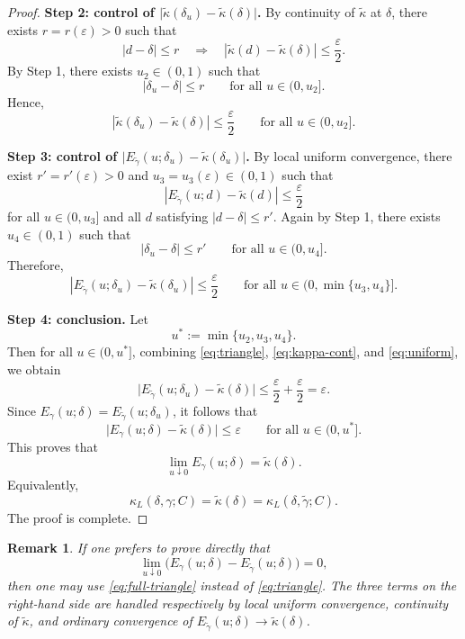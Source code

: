 \documentclass[11pt]{article}
\newtheorem{remark}[theorem]{Remark}
\begin{document}
\begin{proof}
\medskip
\noindent
\textbf{Step 2: control of \(\bigl|\tilde{\kappa}(\delta_u)-\tilde{\kappa}(\delta)\bigr|\).}
By continuity of \(\tilde{\kappa}\) at \(\delta\), there exists \(r=r(\varepsilon)>0\) such that
\[
|d-\delta|\le r
\quad\Longrightarrow\quad
|\tilde{\kappa}(d)-\tilde{\kappa}(\delta)|\le \frac{\varepsilon}{2}.
\]
By Step 1, there exists \(u_2\in(0,1)\) such that
\[
|\delta_u-\delta|\le r
\qquad\text{for all }u\in(0,u_2].
\]
Hence,
\begin{equation}\label{eq:kappa-cont}
|\tilde{\kappa}(\delta_u)-\tilde{\kappa}(\delta)|\le \frac{\varepsilon}{2}
\qquad\text{for all }u\in(0,u_2].
\end{equation}

\medskip
\noindent
\textbf{Step 3: control of \(\bigl|E_{\tilde\gamma}(u;\delta_u)-\tilde{\kappa}(\delta_u)\bigr|\).}
By local uniform convergence, there exist \(r'=r'(\varepsilon)>0\) and \(u_3=u_3(\varepsilon)\in(0,1)\) such that
\[
\left|
E_{\tilde\gamma}(u;d)-\tilde{\kappa}(d)
\right|
\le \frac{\varepsilon}{2}
\]
for all \(u\in(0,u_3]\) and all \(d\) satisfying \(|d-\delta|\le r'\). Again by Step 1, there exists \(u_4\in(0,1)\) such that
\[
|\delta_u-\delta|\le r'
\qquad\text{for all }u\in(0,u_4].
\]
Therefore,
\begin{equation}\label{eq:uniform}
\left|
E_{\tilde\gamma}(u;\delta_u)-\tilde{\kappa}(\delta_u)
\right|
\le \frac{\varepsilon}{2}
\qquad\text{for all }u\in(0,\min\{u_3,u_4\}].
\end{equation}

\medskip
\noindent
\textbf{Step 4: conclusion.}
Let
\[
u^*:=\min\{u_2,u_3,u_4\}.
\]
Then for all \(u\in(0,u^*]\), combining \eqref{eq:triangle}, \eqref{eq:kappa-cont}, and \eqref{eq:uniform}, we obtain
\[
\bigl|E_{\tilde\gamma}(u;\delta_u)-\tilde{\kappa}(\delta)\bigr|
\le
\frac{\varepsilon}{2}+\frac{\varepsilon}{2}
=
\varepsilon.
\]
Since \(E_\gamma(u;\delta)=E_{\tilde\gamma}(u;\delta_u)\), it follows that
\[
\bigl|E_\gamma(u;\delta)-\tilde{\kappa}(\delta)\bigr|
\le \varepsilon
\qquad\text{for all }u\in(0,u^*].
\]
This proves that
\[
\lim_{u\downarrow 0}E_\gamma(u;\delta)=\tilde{\kappa}(\delta).
\]
Equivalently,
\[
\kappa_L(\delta,\gamma;C)=\tilde{\kappa}(\delta)=\kappa_L(\delta,\tilde\gamma;C).
\]
The proof is complete.
\end{proof}

\begin{remark}
If one prefers to prove directly that
\[
\lim_{u\downarrow 0}\bigl(E_\gamma(u;\delta)-E_{\tilde\gamma}(u;\delta)\bigr)=0,
\]
then one may use \eqref{eq:full-triangle} instead of \eqref{eq:triangle}. The three terms on the right-hand side are handled respectively by local uniform convergence, continuity of \(\tilde{\kappa}\), and ordinary convergence of \(E_{\tilde\gamma}(u;\delta)\to \tilde{\kappa}(\delta)\).
\end{remark}
\end{document}

